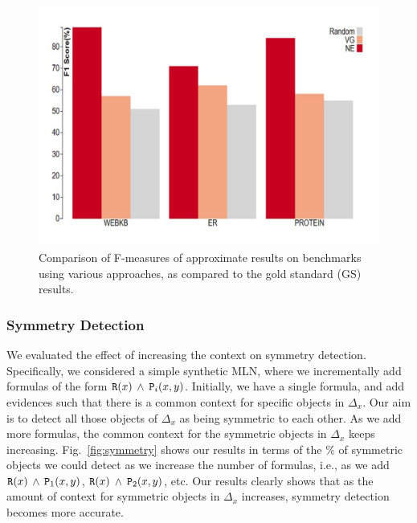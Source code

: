 \begin{figure}
  \centering
\includegraphics[scale=0.40]{quality.pdf}
\caption{\small{\label{fig:quality} Comparison of F-measures of approximate results on benchmarks using various approaches, as compared to the gold standard  (GS) results.}}
\end{figure}

\subsubsection{Symmetry Detection}

We evaluated the effect of increasing the context on symmetry detection. Specifically, we considered a simple synthetic MLN, where we incrementally add formulas of the form ${\tt R}(x)$ $\wedge$ ${\tt P}_i(x,y)$. Initially, we have a single formula, and add  evidences such that there is a common context for specific objects in $\Delta_x$. Our aim is to detect all those objects of $\Delta_x$ as being symmetric to each other. As we add more formulas, the common context for the symmetric objects in $\Delta_x$ keeps increasing. Fig.~\ref{fig:symmetry} shows our results in terms of the $\%$ of symmetric objects we could detect as we increase the number of formulas, i.e., as we add ${\tt R}(x)$ $\wedge$ ${\tt P}_1(x,y)$, ${\tt R}(x)$ $\wedge$ ${\tt P}_2(x,y)$, etc. Our results clearly shows that as the amount of context for symmetric objects in $\Delta_x$ increases, symmetry detection becomes more accurate.

